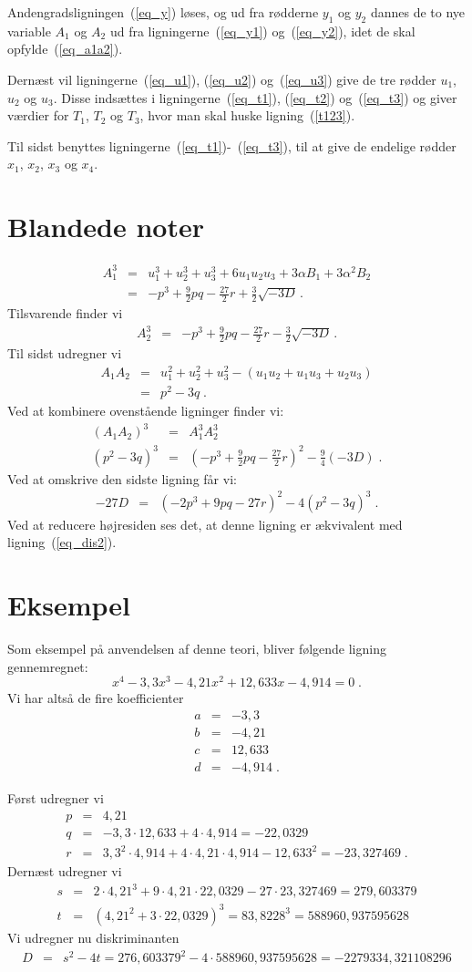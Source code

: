 \documentclass[12pt,oneside,a4paper]{article}
\newcommand{\bas}{\begin{eqnarray*}}
\newcommand{\eas}{\end{eqnarray*}}
\begin{document}
Andengradsligningen~(\ref{eq_y}) løses, og ud fra rødderne $y_1$ og $y_2$
dannes de to nye variable $A_1$ og $A_2$ ud fra ligningerne~(\ref{eq_y1})
og~(\ref{eq_y2}), idet de skal opfylde~(\ref{eq_a1a2}).

Dernæst vil ligningerne~(\ref{eq_u1}), (\ref{eq_u2}) og~(\ref{eq_u3}) give de
tre rødder $u_1$, $u_2$ og $u_3$. Disse indsættes i ligningerne~(\ref{eq_t1}),
(\ref{eq_t2}) og~(\ref{eq_t3}) og giver værdier for $T_1$, $T_2$ og $T_3$, hvor
man skal huske ligning~(\ref{t123}).

Til sidst benyttes ligningerne~(\ref{eq_t1})-~(\ref{eq_t3}), til at give de
endelige rødder $x_1$, $x_2$, $x_3$ og $x_4$.

\section{Blandede noter}
\bas
A_1^3 &=& u_1^3 + u_2^3 + u_3^3 + 6u_1u_2u_3 + 3\alpha B_1 + 3\alpha^2 B_2 \\
&=& -p^3 + \frac92 pq - \frac{27}{2}r + \frac{3}{2} \sqrt{-3D} \,.
\eas
Tilsvarende finder vi
\bas
A_2^3 &=& -p^3 + \frac92 pq - \frac{27}{2}r - \frac{3}{2} \sqrt{-3D} \,.
\eas
Til sidst udregner vi
\bas
A_1A_2 &=& u_1^2 + u_2^2 + u_3^2 - (u_1u_2 + u_1u_3 + u_2u_3) \\
&=& p^2 - 3q \;.
\eas
Ved at kombinere ovenstående ligninger finder vi:
\bas
(A_1A_2)^3 &=& A_1^3 A_2^3 \\
(p^2-3q)^3 &=& \left(-p^3 + \frac92 pq - \frac{27}{2}r\right)^2 - \frac94(-3D) \;.
\eas
Ved at omskrive den sidste ligning får vi:
\bas
-27D &=& (-2p^3+9pq-27r)^2 - 4(p^2-3q)^3 \;.
\eas
Ved at reducere højresiden ses det, at denne ligning er ækvivalent med
ligning~(\ref{eq_dis2}).

\section{Eksempel}
Som eksempel på anvendelsen af denne teori, bliver følgende
ligning gennemregnet:
\begin{equation}
    x^4 - 3,3 x^3 - 4,21 x^2 + 12,633 x - 4,914 = 0 \;.
\end{equation}
Vi har altså de fire koefficienter
\bas
a &=& -3,3 \\
b &=& -4,21 \\
c &=& 12,633 \\
d &=& -4,914 \;.
\eas

Først udregner vi
\bas
p &=& 4,21 \\
q &=& -3,3\cdot 12,633 + 4\cdot 4,914 = -22,0329 \\
r &=& 3,3^2\cdot 4,914 + 4\cdot 4,21 \cdot 4,914 - 12,633^2 = -23,327469 \;.
\eas
Dernæst udregner vi
\bas
s &=& 2\cdot 4,21^3 + 9\cdot 4,21 \cdot 22,0329 - 27\cdot 23,327469 = 279,603379\\
t &=&  (4,21^2 + 3\cdot 22,0329)^3 = 83,8228^3 = 588960,937595628
\eas
Vi udregner nu diskriminanten 
\bas
D &=& s^2-4t = 276,603379^2 - 4\cdot 588960,937595628 = -2279334,321108296 
\eas
\end{document}

